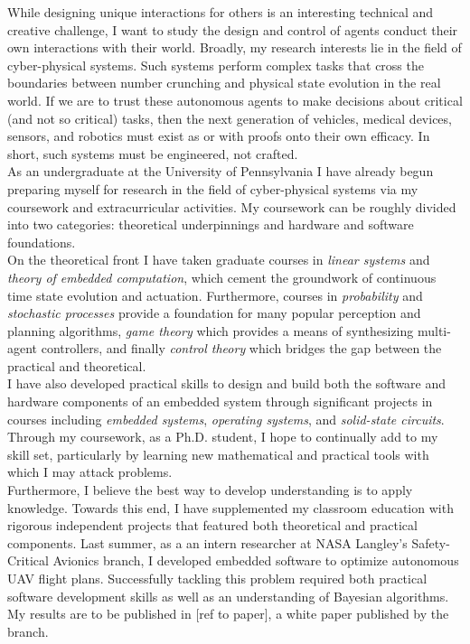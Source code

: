 \documentclass[]{article}
\begin{document}
While designing unique interactions for others is an interesting technical and creative challenge, I want to study the design and control of agents conduct their own interactions with their world. Broadly, my research interests lie in the field of cyber-physical systems. Such systems perform complex tasks that cross the boundaries between number crunching and physical state evolution in the real world. If we are to trust these autonomous agents to make decisions about critical (and not so critical) tasks, then the next generation of vehicles, medical devices, sensors, and robotics must exist as or with proofs onto their own efficacy. In short, such systems must be engineered, not crafted.\\

As an undergraduate at the University of Pennsylvania I have already begun preparing myself for research in the field of cyber-physical systems via my coursework and extracurricular activities. My coursework can be roughly divided into two categories: theoretical underpinnings and hardware and software foundations.\\

On the theoretical front I have taken graduate courses in \emph{linear systems} and \emph{theory of embedded computation}, which cement the groundwork of continuous time state evolution and actuation. Furthermore, courses in \emph{probability} and \emph{stochastic processes} provide a foundation for many popular perception and planning algorithms, \emph{game theory} which provides a means of synthesizing multi-agent controllers, and finally  \emph{control theory} which bridges the gap between the practical and theoretical.\\

I have also developed practical skills to design and build both the software and hardware components of an embedded system through significant projects in courses including \emph{embedded systems}, \emph{operating systems}, and \emph{solid-state circuits}. Through my coursework,  as a Ph.D. student, I hope to continually add to my skill set, particularly by learning new mathematical and practical tools with which I may attack problems.\\

Furthermore, I believe the best way to develop understanding is to apply knowledge. Towards this end, I have supplemented my classroom education with rigorous independent projects that featured both theoretical and practical components. Last summer, as a an intern researcher at NASA Langley's Safety-Critical Avionics branch, I developed embedded software to optimize autonomous UAV flight plans. Successfully tackling this problem required both practical software development skills as well as an understanding of Bayesian algorithms. My results are to be published in [ref to paper], a white paper published by the branch.\\
\end{document}
